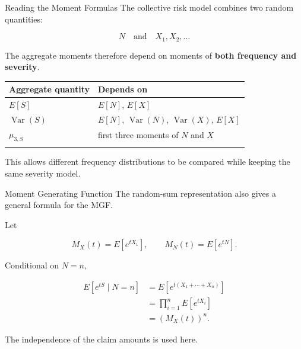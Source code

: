\documentclass[
  ignorenonframetext,
  aspectratio=169,
]{beamer}
\newcounter{none} %
\begin{document}
\begin{frame}{Reading the Moment Formulas}
\protect{}\label{reading-the-moment-formulas}
The collective risk model combines two random quantities:

\[
\boxed{
N
\quad\text{and}\quad
X_1,X_2,\ldots
}
\]

The aggregate moments therefore depend on moments of \textbf{both
frequency and severity}.

{\def\LTcaptype{none} %
\begin{longtable}[]{@{}
  >{\raggedright\arraybackslash}p{}
  >{\raggedright\arraybackslash}p{}@{}}
\toprule\noalign{}
\begin{minipage}[b]{\linewidth}\raggedright
Aggregate quantity
\end{minipage} & \begin{minipage}[b]{\linewidth}\raggedright
Depends on
\end{minipage} \\
\midrule\noalign{}
\endhead
\(E[S]\) & \(E[N]\), \(E[X]\) \\
\(\operatorname{Var}(S)\) & \(E[N]\), \(\operatorname{Var}(N)\),
\(\operatorname{Var}(X)\), \(E[X]\) \\
\(\mu_{3,S}\) & first three moments of \(N\) and \(X\) \\
\bottomrule\noalign{}
\end{longtable}
}

This allows different frequency distributions to be compared while
keeping the same severity model.
\end{frame}

\begin{frame}{Moment Generating Function}
\protect{}\label{moment-generating-function}
The random-sum representation also gives a general formula for the MGF.

Let

\[
M_X(t)=E[e^{tX_1}],
\qquad
M_N(t)=E[e^{tN}].
\]

Conditional on \(N=n\),

\[
\begin{aligned}
E[e^{tS}\mid N=n]
&=
E\left[
e^{t(X_1+\cdots+X_n)}
\right]\\
&=
\prod_{i=1}^{n}E[e^{tX_i}]\\
&=
\left(M_X(t)\right)^n.
\end{aligned}
\]

The independence of the claim amounts is used here.
\end{frame}
\end{document}
